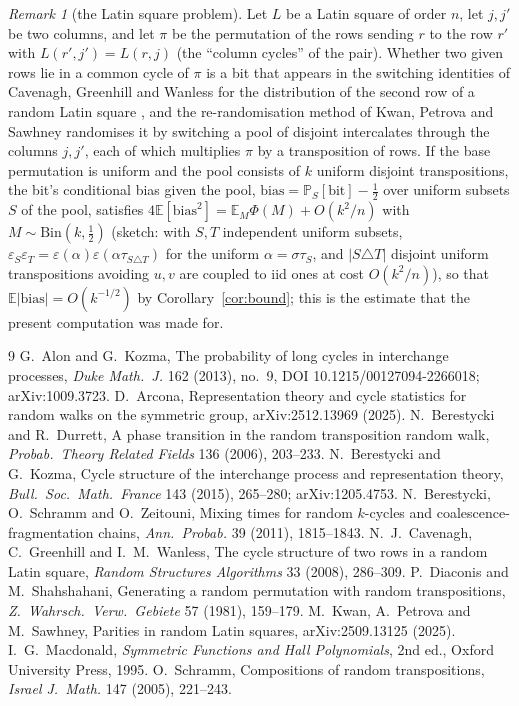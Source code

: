 \documentclass[11pt]{amsart}
\theoremstyle{remark}
\newtheorem{remark}[theorem]{Remark}
\newcommand{\E}{\mathbb{E}}
\renewcommand{\Pr}{\mathbb{P}}
\begin{document}
\begin{remark}[the Latin square problem]\label{rem:latin}
Let $L$ be a Latin square of order $n$, let $j,j'$ be two columns, and let $\pi$ be the permutation of the rows sending $r$ to the row $r'$ with $L(r',j')=L(r,j)$ (the ``column cycles'' of the pair).  Whether two given rows lie in a common cycle of $\pi$ is a bit that appears in the switching identities of Cavenagh, Greenhill and Wanless for the distribution of the second row of a random Latin square \cite{CGW08}, and the re-randomisation method of Kwan, Petrova and Sawhney \cite{KPS25} randomises it by switching a pool of disjoint intercalates through the columns $j,j'$, each of which multiplies $\pi$ by a transposition of rows.  If the base permutation is uniform and the pool consists of $k$ uniform disjoint transpositions, the bit's conditional bias given the pool, $\mathrm{bias}=\Pr_S[\text{bit}]-\tfrac12$ over uniform subsets $S$ of the pool, satisfies $4\E[\mathrm{bias}^2]=\E_{M}\Phi(M)+O(k^2/n)$ with $M\sim\mathrm{Bin}(k,\tfrac12)$ (sketch: with $S,T$ independent uniform subsets, $\varepsilon_S\varepsilon_T=\varepsilon(\alpha)\varepsilon(\alpha\tau_{S\triangle T})$ for the uniform $\alpha=\sigma\tau_S$, and $|S\triangle T|$ disjoint uniform transpositions avoiding $u,v$ are coupled to iid ones at cost $O(k^2/n)$), so that $\E|\mathrm{bias}|=O(k^{-1/2})$ by Corollary~\ref{cor:bound}; this is the estimate that the present computation was made for.
\end{remark}

\begin{thebibliography}{9}
 G.~Alon and G.~Kozma, The probability of long cycles in interchange processes, \emph{Duke Math.\ J.} 162 (2013), no.~9, DOI 10.1215/00127094-2266018; arXiv:1009.3723.
 D.~Arcona, Representation theory and cycle statistics for random walks on the symmetric group, arXiv:2512.13969 (2025).
 N.~Berestycki and R.~Durrett, A phase transition in the random transposition random walk, \emph{Probab.\ Theory Related Fields} 136 (2006), 203--233.
 N.~Berestycki and G.~Kozma, Cycle structure of the interchange process and representation theory, \emph{Bull.\ Soc.\ Math.\ France} 143 (2015), 265--280; arXiv:1205.4753.
 N.~Berestycki, O.~Schramm and O.~Zeitouni, Mixing times for random $k$-cycles and coalescence-fragmentation chains, \emph{Ann.\ Probab.} 39 (2011), 1815--1843.
 N.~J.~Cavenagh, C.~Greenhill and I.~M.~Wanless, The cycle structure of two rows in a random Latin square, \emph{Random Structures Algorithms} 33 (2008), 286--309.
 P.~Diaconis and M.~Shahshahani, Generating a random permutation with random transpositions, \emph{Z.\ Wahrsch.\ Verw.\ Gebiete} 57 (1981), 159--179.
 M.~Kwan, A.~Petrova and M.~Sawhney, Parities in random Latin squares, arXiv:2509.13125 (2025).
 I.~G.~Macdonald, \emph{Symmetric Functions and Hall Polynomials}, 2nd ed., Oxford University Press, 1995.
 O.~Schramm, Compositions of random transpositions, \emph{Israel J.\ Math.} 147 (2005), 221--243.
\end{thebibliography}
\end{document}
